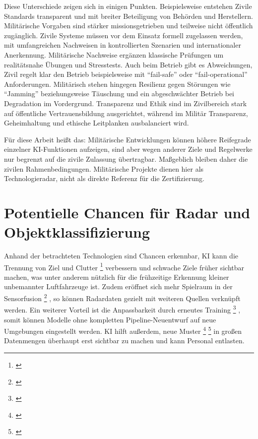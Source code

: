 Diese Unterschiede zeigen sich in einigen Punkten. Beispielsweise entstehen Zivile Standards 
transparent und mit breiter Beteiligung von Behörden und Herstellern. 
Militärische Vorgaben sind stärker missionsgetrieben und teilweise nicht öffentlich zugänglich. 
Zivile Systeme müssen vor dem Einsatz formell zugelassen werden, mit umfangreichen Nachweisen in 
kontrollierten Szenarien und internationaler Anerkennung. Militärische Nachweise 
ergänzen klassische Prüfungen um realitätsnahe Übungen und Stresstests. Auch beim 
Betrieb gibt es Abweichungen, Zivil regelt klar den Betrieb beispielsweise mit ``fail-safe'' oder 
``fail-operational'' Anforderungen. Militärisch stehen hingegen Resilienz gegen Störungen wie 
``Jamming'' beziehungsweise Täuschung und ein abgeschwächter Betrieb bei Degradation 
im Vordergrund. Transparenz und Ethik sind im Zivilbereich stark auf öffentliche 
Vertrauensbildung ausgerichtet, während im Militär Transparenz, Geheimhaltung 
und ethische Leitplanken ausbalanciert wird.

Für diese Arbeit heißt das: Militärische Entwicklungen können höhere Reifegrade einzelner 
KI-Funktionen aufzeigen, sind aber wegen anderer Ziele und Regelwerke 
nur begrenzt auf die zivile Zulassung übertragbar. Maßgeblich bleiben daher die zivilen 
Rahmenbedingungen. Militärische Projekte dienen hier als 
Technologieradar, nicht als direkte Referenz für die Zertifizierung.




\section{Potentielle Chancen für Radar und Objektklassifizierung}\label{sec:ki-chancen-risiken}

Anhand der betrachteten Technologien sind Chancen erkennbar, KI kann die Trennung von Ziel und 
Clutter \footnote{ \parencite{Coluccia2020Sensors4172}}
verbessern und schwache Ziele früher sichtbar machen, was unter anderem nützlich für die frühzeitige 
Erkennung kleiner unbemannter Luftfahrzeuge ist. Zudem eröffnet sich mehr Spielraum in der Sensorfusion \footnote{ \parencite{shell-jpt-2022}}
, so können Radardaten gezielt mit weiteren Quellen verknüpft werden. 
Ein weiterer Vorteil ist die Anpassbarkeit durch erneutes Training \footnote{ \parencite{Stewart2016Autopilot80}}
, somit können Modelle 
ohne kompletten Pipeline-Neuentwurf auf neue Umgebungen eingestellt werden. KI hilft außerdem, neue Muster 
\footnote{ \parencite{conduit2017-superalloy-nn}} \footnote{ \parencite{alphafold-nature-2021}}
in großen Datenmengen überhaupt erst sichtbar zu machen und kann Personal entlasten.

